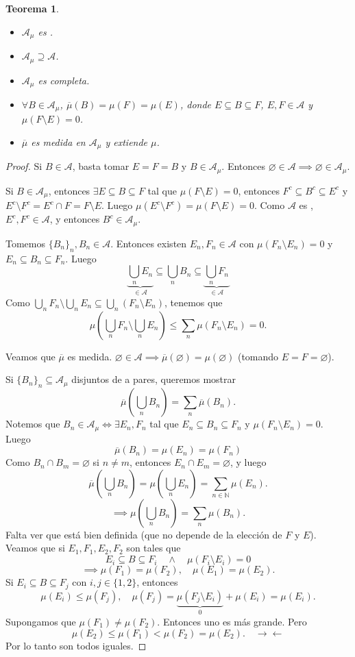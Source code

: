 \documentclass{article}
\newtheorem{theorem}{Teorema}[subsection]
\theoremstyle{definition}
\theoremstyle{remark}
\numberwithin{equation}{section}
\newcommand{\A}{\mathcal{A}}
\newcommand{\N}{\mathbb{N}}
\renewcommand{\bar}{\overline}
\newcommand{\br}[1]{\left( #1 \right)}
\newcommand{\sialg}{\text{$\sigma$-álgebra}}
\begin{document}
\begin{theorem}
  \
  \begin{itemize}
    \item $\A_\mu$ es \sialg.
    \item $\A_\mu \supseteq \A$.
    \item $\A_\mu$ es completa.
    \item $\forall B \in \A_\mu$, $\bar\mu(B) = \mu(F) = \mu(E)$, donde $E \subseteq B \subseteq F$, $E,F \in \A$ y $\mu(F \setminus E) = 0$.
    \item $\bar\mu$ es medida en $\A_\mu$ y extiende $\mu$.
  \end{itemize}
\end{theorem}
\begin{proof}
  Si $B \in \A$, basta tomar $E = F = B$ y $B \in \A_\mu$. Entonces $\varnothing \in \A \implies \varnothing \in \A_\mu$.

  Si $B \in \A_\mu$, entonces $\exists E \subseteq B \subseteq F$ tal que $\mu(F \setminus E) = 0$, entonces $F^c \subseteq B^c \subseteq E^c$ y $E^c \setminus F^c = E^c \cap F = F \setminus E$. Luego $\mu(E^c \setminus F^c) = \mu(F \setminus E) = 0$.
  Como $\A$ es \sialg, $E^c, F^c \in \A$, y entonces $B^c \in \A_\mu$.

  Tomemos $\{B_n\}_n, B_n \in \A$. Entonces existen $E_n,F_n \in \A$ con $\mu(F_n \setminus E_n) = 0$ y $E_n \subseteq B_n \subseteq F_n$. Luego
  \[\underbrace{\bigcup_n E_n}_{\in \A} \subseteq \bigcup_n B_n \subseteq \underbrace{\bigcup_n F_n}_{\in \A}\]
  Como $\bigcup_n F_n \setminus \bigcup_n E_n \subseteq \bigcup_n (F_n \setminus E_n)$, tenemos que
  \[\mu\br{\bigcup_n F_n \setminus \bigcup_n E_n} \leq \sum_n \mu(F_n \setminus E_n) = 0.\]

  Veamos que $\bar\mu$ es medida.
  $\varnothing \in \A \implies \bar\mu(\varnothing) = \mu(\varnothing)$ (tomando $E=F=\varnothing$).

  Si $\{B_n\}_n \subseteq \A_\mu$ disjuntos de a pares, queremos mostrar
  \[\bar\mu\br{\bigcup_n B_n} = \sum_n \bar\mu(B_n).\]
  Notemos que $B_n \in \A_\mu \iff \exists E_n, F_n$ tal que $E_n \subseteq B_n \subseteq F_n$ y $\mu(F_n \setminus E_n) = 0$. Luego
  \[\bar\mu(B_n) = \mu(E_n) = \mu(F_n)\]
  Como $B_n \cap B_m = \varnothing$ si $n \neq m$, entonces $E_n \cap E_m = \varnothing$, y luego
  \[\bar\mu\br{\bigcup_n B_n} = \mu\br{\bigcup_n E_n} = \sum_{n \in \N} \mu(E_n).\]
  \[\implies \mu\br{\bigcup_n B_n} = \sum_n \mu(B_n).\]
  Falta ver que está bien definida (que no depende de la elección de $F$ y $E$).
  Veamos que si $E_1,F_1, E_2,F_2$ son tales que
  \[E_i \subseteq B \subseteq F_i \quad\land\quad \mu(F_i \setminus E_i) = 0\]
  \[\implies \mu(F_1) = \mu(F_2), \quad \mu(E_1) = \mu(E_2).\]
  Si $E_i \subseteq B \subseteq F_j$ con $i,j \in \{1,2\}$, entonces
  \[\mu(E_i) \leq \mu(F_j), \quad \mu(F_j) = \underbrace{\mu(F_j \setminus E_i)}_{0} + \mu(E_i) = \mu(E_i).\]
  Supongamos que $\mu(F_1) \neq \mu(F_2)$. Entonces uno es más grande. Pero
  \[\mu(E_2) \leq \mu(F_1) < \mu(F_2) = \mu(E_2). \quad \to\gets\]
  Por lo tanto son todos iguales.
\end{proof}
\end{document}
